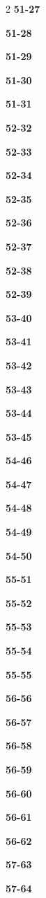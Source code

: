 \documentclass[10pt,a4paper]{article}
\begin{document}
\begin{multicols}{2}
\noindent\textbf{51-27}\ \par
\noindent\textbf{51-28}\ \par
\noindent\textbf{51-29}\ \par
\noindent\textbf{51-30}\ \par
\noindent\textbf{51-31}\ \par
\noindent\textbf{52-32}\ \par
\noindent\textbf{52-33}\ \par
\noindent\textbf{52-34}\ \par
\noindent\textbf{52-35}\ \par
\noindent\textbf{52-36}\ \par
\noindent\textbf{52-37}\ \par
\noindent\textbf{52-38}\ \par
\noindent\textbf{52-39}\ \par
\noindent\textbf{53-40}\ \par
\noindent\textbf{53-41}\ \par
\noindent\textbf{53-42}\ \par
\noindent\textbf{53-43}\ \par
\noindent\textbf{53-44}\ \par
\noindent\textbf{53-45}\ \par
\noindent\textbf{54-46}\ \par
\noindent\textbf{54-47}\ \par
\noindent\textbf{54-48}\ \par
\noindent\textbf{54-49}\ \par
\noindent\textbf{54-50}\ \par
\noindent\textbf{55-51}\ \par
\noindent\textbf{55-52}\ \par
\noindent\textbf{55-53}\ \par
\noindent\textbf{55-54}\ \par
\noindent\textbf{55-55}\ \par
\noindent\textbf{56-56}\ \par
\noindent\textbf{56-57}\ \par
\noindent\textbf{56-58}\ \par
\noindent\textbf{56-59}\ \par
\noindent\textbf{56-60}\ \par
\noindent\textbf{56-61}\ \par
\noindent\textbf{56-62}\ \par
\noindent\textbf{57-63}\ \par
\noindent\textbf{57-64}\ \par

\end{multicols}
\end{document}
